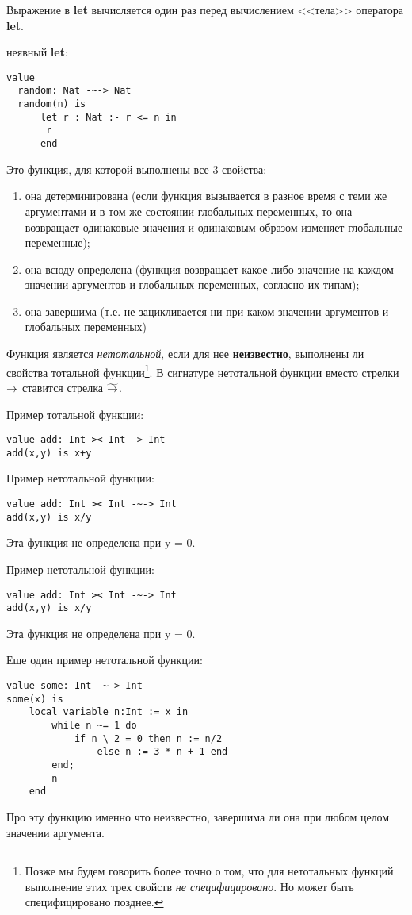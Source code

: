 \begin{itemize}
Выражение в \textbf{let} вычисляется один раз перед вычислением <<тела>> оператора \textbf{let}.

неявный \textbf{let}:
\begin{lstlisting}
value
  random: Nat -~-> Nat
  random(n) is
      let r : Nat :- r <= n in
	   r
      end	
\end{lstlisting}

\end{itemize}


Это функция, для которой выполнены все 3 свойства:
\begin{enumerate}
  \item она детерминирована (если функция вызывается в разное время с теми же аргументами и в том же состоянии глобальных переменных, то она возвращает одинаковые значения и одинаковым образом изменяет глобальные переменные);
  \item она всюду определена (функция возвращает какое-либо значение на каждом значении аргументов и глобальных переменных, согласно их типам);
  \item она завершима (т.е. не зацикливается ни при каком значении аргументов и глобальных переменных)
\end{enumerate}
Функция является \emph{нетотальной}, если для нее \textbf{неизвестно}, выполнены ли свойства тотальной функции\footnote{Позже мы будем говорить более точно о том, что для нетотальных функций выполнение этих трех свойств \emph{не специфицировано}. Но может быть специфицировано позднее.}. В сигнатуре нетотальной функции вместо стрелки $\rightarrow$ ставится стрелка $\widetilde{\rightarrow}$.

Пример тотальной функции:
\begin{lstlisting}
value add: Int >< Int -> Int
add(x,y) is x+y
\end{lstlisting}

Пример нетотальной функции:
\begin{lstlisting}
value add: Int >< Int -~-> Int
add(x,y) is x/y
\end{lstlisting}
Эта функция не определена при y = 0.

Пример нетотальной функции:
\begin{lstlisting}
value add: Int >< Int -~-> Int
add(x,y) is x/y
\end{lstlisting}
Эта функция не определена при y = 0.

Еще один пример нетотальной функции:
\begin{lstlisting}
value some: Int -~-> Int
some(x) is
    local variable n:Int := x in
        while n ~= 1 do
            if n \ 2 = 0 then n := n/2
                else n := 3 * n + 1 end
        end;
        n
    end
\end{lstlisting}
Про эту функцию именно что неизвестно, завершима ли она при любом целом значении аргумента.

